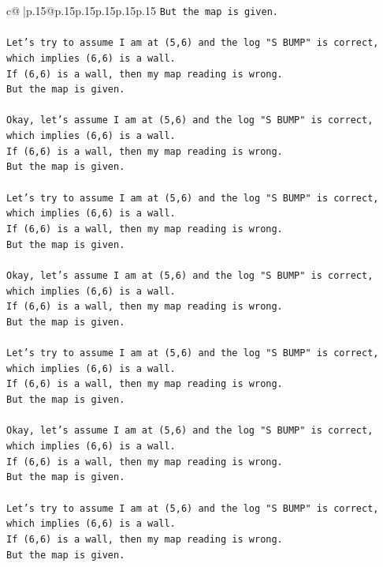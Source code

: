 \documentclass{article}
\begin{document}
{\begin{supertabular}{c@{$\;$}|p{.15\linewidth}@{}p{.15\linewidth}p{.15\linewidth}p{.15\linewidth}p{.15\linewidth}p{.15\linewidth}}
{{{\texttt{But the map is given.} \\
\\ 
\texttt{Let's try to assume I am at (5,6) and the log "S BUMP" is correct, which implies (6,6) is a wall.} \\
\texttt{If (6,6) is a wall, then my map reading is wrong.} \\
\texttt{But the map is given.} \\
\\ 
\texttt{Okay, let's assume I am at (5,6) and the log "S BUMP" is correct, which implies (6,6) is a wall.} \\
\texttt{If (6,6) is a wall, then my map reading is wrong.} \\
\texttt{But the map is given.} \\
\\ 
\texttt{Let's try to assume I am at (5,6) and the log "S BUMP" is correct, which implies (6,6) is a wall.} \\
\texttt{If (6,6) is a wall, then my map reading is wrong.} \\
\texttt{But the map is given.} \\
\\ 
\texttt{Okay, let's assume I am at (5,6) and the log "S BUMP" is correct, which implies (6,6) is a wall.} \\
\texttt{If (6,6) is a wall, then my map reading is wrong.} \\
\texttt{But the map is given.} \\
\\ 
\texttt{Let's try to assume I am at (5,6) and the log "S BUMP" is correct, which implies (6,6) is a wall.} \\
\texttt{If (6,6) is a wall, then my map reading is wrong.} \\
\texttt{But the map is given.} \\
\\ 
\texttt{Okay, let's assume I am at (5,6) and the log "S BUMP" is correct, which implies (6,6) is a wall.} \\
\texttt{If (6,6) is a wall, then my map reading is wrong.} \\
\texttt{But the map is given.} \\
\\ 
\texttt{Let's try to assume I am at (5,6) and the log "S BUMP" is correct, which implies (6,6) is a wall.} \\
\texttt{If (6,6) is a wall, then my map reading is wrong.} \\
\texttt{But the map is given.} \\
}}}
\end{supertabular}}
\end{document}
